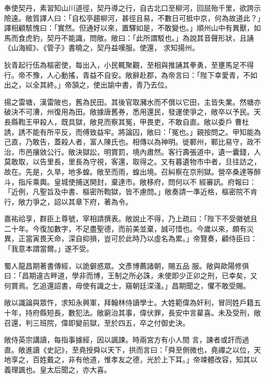 \begin{pinyinscope}
 奉使契丹，素習知山川道徑，契丹導之行，自古北口至柳河，回屈殆千里，欲誇示險遠。敞質譯人曰：「自松亭趨柳河，甚徑且易，不數日可抵中京，何為故道此？」譯相顧駭愧曰：「實然。但通好以來，置驛如是，不敢變也。」順州山中有異獸，如馬而食虎豹，契丹不能識，問敞。敞曰：「此所謂駁也。」為說其音聲形狀，且誦《山海經》、《管子》書曉之，契丹益嘆服。使還，
 求知揚州。



 狄青起行伍為樞密使，每出入，小民輒聚觀，至相與推誦其拳勇，至壅馬足不得行。帝不豫，人心動搖，青益不自安。敞辭赴郡，為帝言曰：「陛下幸愛青，不如出之，以全其終。」帝頷之，使出諭中書，青乃去位。



 揚之雷塘，漢雷陂也，舊為民田。其後官取瀦水而不償以它田，主皆失業。然塘亦破決不可漕，州復用為田。敞據唐舊券，悉用還民，發運使爭之，敞卒以予民。天長縣鞫王甲殺人，既具獄，敞見而察其冤，甲畏吏，不敢自直。敞以委戶
 曹杜誘，誘不能有所平反，而傅致益牢。將論囚，敞曰：「冤也。」親按問之。甲知能為己直，乃敢告，蓋殺人者，富人陳氏也。相傳以為神明。徙鄆州，鄆比易守，政不治，市邑攘敓公行。敞決獄訟，明賞罰，境內肅然。客行壽張道中，遺一囊錢，人莫敢取，以告里長，里長為守視，客還，取得之。又有暮遺物市中者，旦往訪之，故在。先是，久旱，地多蝗。敞至而雨，蝗出境。召糾察在京刑獄。營卒桑達等醉斗，指斥乘輿。皇城使捕送開封，棄達市。敞移府，問何以不
 經審訊。府報曰：「近例，凡聖旨及中書、樞密所鞫獄，皆不慮問。」敞奏請一準近格，樞密院不肯行，敞力爭之，詔以其章下府，著為令。



 嘉祐祫享，群臣上尊號，宰相請撰表。敞說止不得，乃上疏曰：「陛下不受徽號且二十年。今復加數字，不足盡聖德，而前美並棄，誠可惜也。今歲以來，頗有災異，正當寅畏天命，深自抑損，豈可於此時乃以虛名為累。」帝覽奏，顧侍臣曰：「我意本謂當爾。」遂不受。



 蜀人龍昌期著書傳經，以詭僻惑眾。文彥博薦諸朝，賜五品
 服。敞與歐陽修俱曰：「昌期違古畔道，學非而博，王制之所必誅，未使即少正卯之刑，已幸矣，又何賞焉。乞追還詔書，毋使有識之士，窺朝廷深淺。」昌期聞之，懼不敢受賜。



 敞以識論與眾忤，求知永興軍，拜翰林侍讀學士。大姓範偉為奸利，冒同姓戶籍五十年，持府縣短長，數犯法。敞窮治其事，偉伏罪，長安中言雚喜。未及受刑，敞召還，判三班院，偉即變前獄，至於四五，卒之付御史決。



 敞侍英宗講讀，每指事據經，因以諷諫。時兩宮方有小人間
 言，諫者或訐而過直。敞進讀《史記》，至堯授舜以天下，拱而言曰：「舜至側微也，堯禪之以位，天地享之，百姓戴之，非有他道，惟孝友之德，光於上下耳。」帝竦體改容，知其以義理諷也。皇太后聞之，亦大喜。




\end{pinyinscope}
